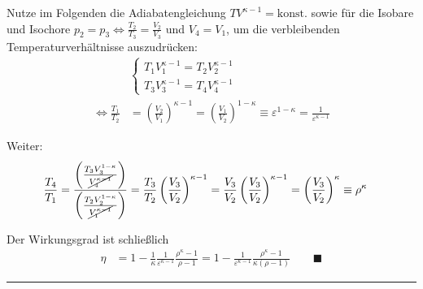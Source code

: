 \documentclass{article}
\newcommand{\lr}[1]{\left(#1\right)}
\begin{document}
{	Nutze im Folgenden die Adiabatengleichung $TV^{\kappa-1} = \text{konst.}$ sowie für die Isobare und Isochore $p_2 = p_3 \Leftrightarrow \frac{T_2}{T_3} = \frac{V_2}{V_3}$ und $V_4 = V_1$, um die verbleibenden Temperaturverhältnisse auszudrücken:
		\begin{align*}
			& \begin{cases}
				T_1 V_1^{\kappa-1} = T_2 V_2^{\kappa-1} \\
				T_3 V_3^{\kappa-1} = T_4 V_4^{\kappa-1}
			\end{cases} \\
			\Leftrightarrow \frac{T_1}{T_2} &= \lr{ \frac{V_2}{V_1} }^{\kappa-1} = \lr{ \frac{V_1}{V_2} }^{1-\kappa} \equiv \varepsilon^{1-\kappa} = \frac{1}{\varepsilon^{\kappa-1}}
		\end{align*}
	
	Weiter:
		\begin{align*}
			\frac{T_4}{T_1} &= \frac{ \lr{ \frac{ T_3 V_3^{1-\kappa} }{ \cancel{ V_4^{\kappa-1} } } } }{ \lr{ \frac{ T_2 V_2^{1-\kappa} }{ \cancel{ V_1^{\kappa-1} } } } } = \frac{T_3}{T_2} \lr{ \frac{V_3}{V_2} }^{\kappa-1} = \frac{V_3}{V_2} \lr{ \frac{V_3}{V_2} }^{\kappa-1} = \lr{ \frac{V_3}{V_2} }^\kappa \equiv \rho^\kappa
		\end{align*}
	
	Der Wirkungsgrad ist schließlich
		\begin{align*}
			\eta &= 1 - \frac{1}{\kappa} \frac{1}{\varepsilon^{\kappa-1}} \frac{ \rho^\kappa - 1 }{ \rho - 1 } = 1 - \frac{1}{\varepsilon^{\kappa-1}} \frac{ \rho^\kappa - 1 }{ \kappa (\rho - 1) } \qquad \blacksquare
		\end{align*}
\hrule
}


\newpage
\end{document}
